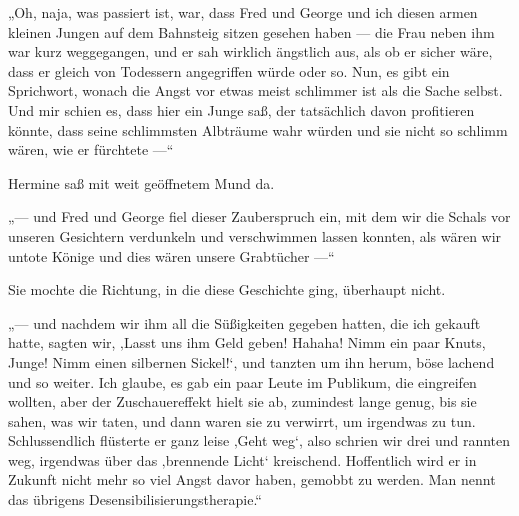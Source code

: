 „Oh, naja, was passiert ist, war, dass Fred und George und ich diesen armen kleinen Jungen auf dem Bahnsteig sitzen gesehen haben — die Frau neben ihm war kurz weggegangen, und er sah wirklich ängstlich aus, als ob er sicher wäre, dass er gleich von Todessern angegriffen würde oder so. Nun, es gibt ein Sprichwort, wonach die Angst vor etwas meist schlimmer ist als die Sache selbst. Und mir schien es, dass hier ein Junge saß, der tatsächlich davon profitieren könnte, dass seine schlimmsten Albträume wahr würden und sie nicht so schlimm wären, wie er fürchtete —“

Hermine saß mit weit geöffnetem Mund da.

„— und Fred und George fiel dieser Zauberspruch ein, mit dem wir die Schals vor unseren Gesichtern verdunkeln und verschwimmen lassen konnten, als wären wir untote Könige und dies wären unsere Grabtücher —“

Sie mochte die Richtung, in die diese Geschichte ging, überhaupt nicht.

„— und nachdem wir ihm all die Süßigkeiten gegeben hatten, die ich gekauft hatte, sagten wir, ‚Lasst uns ihm Geld geben! Hahaha! Nimm ein paar Knuts, Junge! Nimm einen silbernen Sickel!‘, und tanzten um ihn herum, böse lachend und so weiter. Ich glaube, es gab ein paar Leute im Publikum, die eingreifen wollten, aber der Zuschauereffekt hielt sie ab, zumindest lange genug, bis sie sahen, was wir taten, und dann waren sie zu verwirrt, um irgendwas zu tun. Schlussendlich flüsterte er ganz leise ‚Geht weg‘, also schrien wir drei und rannten weg, irgendwas über das ‚brennende Licht‘ kreischend. Hoffentlich wird er in Zukunft nicht mehr so viel Angst davor haben, gemobbt zu werden. Man nennt das übrigens Desensibilisierungstherapie.“

